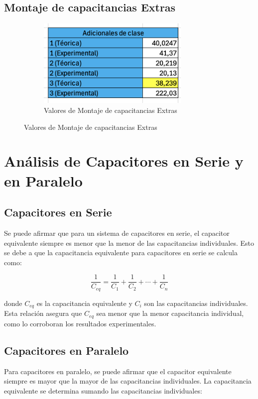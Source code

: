 \subsection{Montaje de capacitancias Extras}

\begin{figure}[H]
    \centering
    \begin{subfigure}[b]{\textwidth}
        \centering
        \includegraphics[width=0.8\textwidth]{Figures/1. Content/MontajeCapacitanciasExtra.png}
        \caption{Valores de Montaje de capacitancias Extras}
        \label{fig: Montaje de capacitancias Extras}
    \end{subfigure}
    \hfill
\end{figure}

\section{Análisis de Capacitores en Serie y en Paralelo}

\subsection{Capacitores en Serie}
Se puede afirmar que para un sistema de capacitores en serie, el capacitor equivalente siempre es menor que la menor de las capacitancias individuales. Esto se debe a que la capacitancia equivalente para capacitores en serie se calcula como:

\[
\frac{1}{C_{eq}} = \frac{1}{C_1} + \frac{1}{C_2} + \cdots + \frac{1}{C_n}
\]

donde \( C_{eq} \) es la capacitancia equivalente y \( C_i \) son las capacitancias individuales. Esta relación asegura que \( C_{eq} \) sea menor que la menor capacitancia individual, como lo corroboran los resultados experimentales.

\subsection{Capacitores en Paralelo}
Para capacitores en paralelo, se puede afirmar que el capacitor equivalente siempre es mayor que la mayor de las capacitancias individuales. La capacitancia equivalente se determina sumando las capacitancias individuales:

